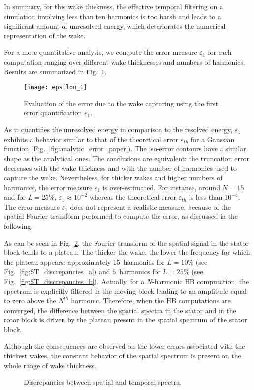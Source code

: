In summary, for this wake thickness, the effective temporal filtering 
on a simulation involving less than ten harmonics is too harsh and leads 
to a significant amount of unresolved energy, 
which deteriorates the numerical representation
of the wake.

For a more quantitative analysis, we compute the error measure
$\varepsilon_1$ for each computation ranging over different 
wake thicknesses and numbers of harmonics. 
Results are summarized in Fig.~\ref{fig:crit_1_3d}.
\begin{figure}[htb]
    \centering\texttt{[image: epsilon\_1]}
  \caption{Evaluation of the error due to the wake 
  capturing using the first error quantification $\varepsilon_1$.}
  \label{fig:crit_1_3d}
\end{figure}
As it quantifies the unresolved energy in 
comparison to the resolved energy, $\varepsilon_1$ 
exhibits a behavior similar to that of 
the theoretical error $\varepsilon_{th}$ for a Gaussian function 
(Fig.~\ref{fig:analytic_error_paper}).
The iso-error contours have a similar shape 
as the analytical ones. 
The conclusions are equivalent: the truncation error decreases with 
the wake thickness and with the number of harmonics used to capture the wake.
Nevertheless, for thicker wakes and higher numbers of harmonics, 
the error measure $\varepsilon_1$ is over-estimated. 
For instance, around $N=15$ and for $L=25\%$,
$\varepsilon_1 \approx 10^{-2}$ whereas the theoretical error $\varepsilon_{th}$
is less than $10^{-4}$. The error 
measure $\varepsilon_1$ does not represent a 
realistic measure, because of the spatial 
Fourier transform performed to compute 
the error, as discussed in the following.

As can be seen in Fig.~\ref{fig:ST_discrepancies}, 
the Fourier transform of the spatial signal in the stator block tends to a plateau. 
The thicker the wake, 
the lower the frequency for which the plateau appears: 
approximately 15~harmonics for $L=10\%$
(see Fig.~\ref{fig:ST_discrepancies_a}) and 
6~harmonics for $L=25\%$ (see Fig.~\ref{fig:ST_discrepancies_b}).
Actually, for a $N$-harmonic HB computation, the spectrum is 
explicitly filtered in the moving block leading to an amplitude 
equal to zero above the $N^{th}$ harmonic. 
Therefore, when the HB computations are converged, the difference between the spatial 
spectra in the stator and in the rotor block is driven by the plateau present 
in the spatial spectrum of the stator block.

Although the consequences are observed 
on the lower errors associated with the thickest wakes, 
the constant behavior of the spatial spectrum is 
present on the whole range of wake thickness. 
\begin{figure}[htb]
  \begin{center}
  \end{center}
  \caption{Discrepancies between spatial and temporal spectra.}
  \label{fig:ST_discrepancies}
\end{figure}

